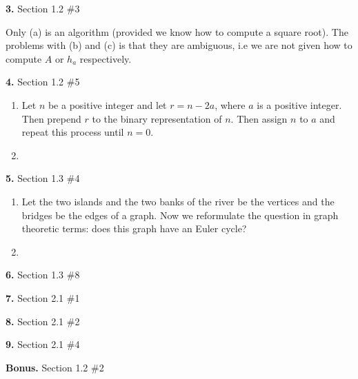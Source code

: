 \documentclass[letterpaper, 11pt]{article}
\newcommand{\hwnumber}[3]{\medskip \noindent\textbf{#1.} Section #2 \##3 \smallskip}
\begin{document}
\newpage

\hwnumber{3}{1.2}{3}

Only (a) is an algorithm (provided we know how to compute a square root). The
problems with (b) and (c) is that they are ambiguous, i.e we are not given how
to compute $A$ or $h_a$ respectively. 

\hwnumber{4}{1.2}{5}

\begin{enumerate}[label = (\alph*)]
  \item Let $n$ be a positive integer and let $r = n - 2a$, where $a$ is 
    a positive integer. Then prepend $r$ to the binary representation of 
    $n$. Then assign $n$ to $a$ and repeat this process until $n = 0$. 

  \item 

\end{enumerate}


\hwnumber{5}{1.3}{4}
\begin{enumerate}[label = (\alph*)]
  \item Let the two islands and the two banks of the river be the vertices and the
    bridges be the edges of a graph. Now we reformulate the question in graph
    theoretic terms: does this graph have an Euler cycle?

   \item 
\end{enumerate}



\hwnumber{6}{1.3}{8}


\hwnumber{7}{2.1}{1}


\hwnumber{8}{2.1}{2}


\hwnumber{9}{2.1}{4}


\hwnumber{Bonus}{1.2}{2}
\end{document}

